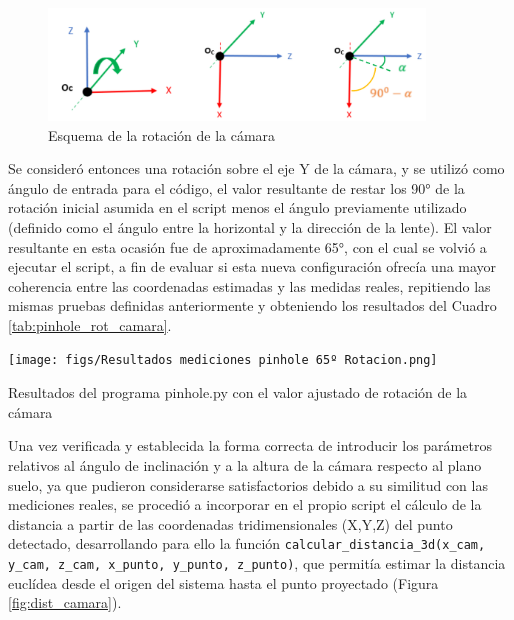   \begin{figure}[H]
     \centering
     \begin{center}
       \includegraphics[width=100mm]{figs/Esquema rotación cámara.png}
     \end{center}
     \caption{Esquema de la rotación de la cámara}
    \label{fig:esquema_rot_camara}
  \end{figure}

Se consideró entonces una rotación sobre el eje Y de la cámara, y se utilizó como ángulo de entrada para el código, el valor resultante de restar los 90° de la rotación inicial asumida en el script menos el ángulo previamente utilizado (definido como el ángulo entre la horizontal y la dirección de la lente). El valor resultante en esta ocasión fue de aproximadamente 65°, con el cual se volvió a ejecutar el script, a fin de evaluar si esta nueva configuración ofrecía una mayor coherencia entre las coordenadas estimadas y las medidas reales, repitiendo las mismas pruebas definidas anteriormente y obteniendo los resultados del Cuadro \ref{tab:pinhole_rot_camara}.

   \begin{table}[H]
   \centering
   \begin{center}
     \texttt{[image: figs/Resultados mediciones pinhole 65º Rotacion.png]}
   \end{center}
   \caption{Resultados del programa pinhole.py con el valor ajustado de rotación de la cámara}
   \label{tab:pinhole_rot_camara}
  \end{table}
  
Una vez verificada y establecida la forma correcta de introducir los parámetros relativos al ángulo de inclinación y a la altura de la cámara respecto al plano suelo, ya que pudieron considerarse satisfactorios debido a su similitud con las mediciones reales, se procedió a incorporar en el propio script el cálculo de la distancia a partir de las coordenadas tridimensionales (X,Y,Z) del punto detectado, desarrollando para ello la función \texttt{calcular\_distancia\_3d(x\_cam, y\_cam, z\_cam, x\_punto, y\_punto, z\_punto)}, que permitía estimar la distancia euclídea desde el origen del sistema hasta el punto proyectado (Figura \ref{fig:dist_camara}). 

